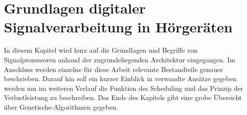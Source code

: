 \chapter{Grundlagen digitaler Signalverarbeitung in Hörgeräten}
\label{chap:grundlagen}
In diesem Kapitel wird kurz auf die Grundlagen und Begriffe von Signalprozessoren anhand der zugrundeliegenden Architektur eingegangen. Im Anschluss werden einzelne für diese Arbeit relevante Bestandteile genauer beschrieben. Darauf hin soll ein kurzer Einblick in verwandte Ansätze gegeben werden um im weiteren Verlauf die Funktion des Scheduling und das Prinzip der Verlustleistung zu beschreiben. Das Ende des Kapitels gibt eine grobe Übersicht über Genetische-Algorithmen gegeben.




